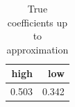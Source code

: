 \begin{table}[ht]
\centering
\begin{tabular}{rr}
  \hline
high & low \\ 
  \hline
0.503 & 0.342 \\ 
   \hline
\end{tabular}
\caption{True coefficients up to approximation} 
\label{tab:true-syn-beta}
\end{table}
